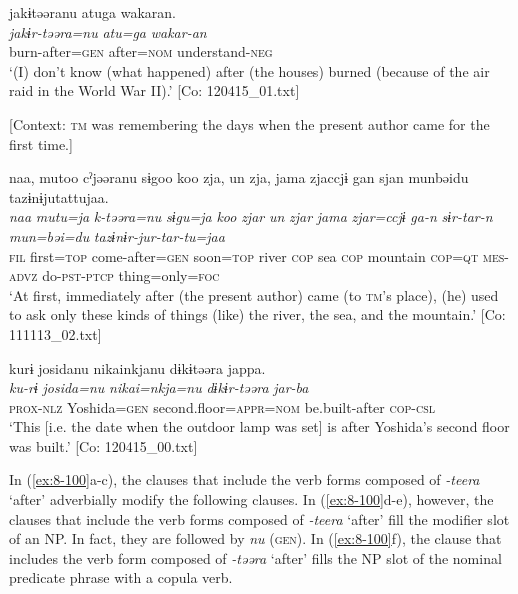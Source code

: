 \ex
{\TM}
\glll  jakɨtəəranu  atuga  wakaran.\\
\textit{jakɨr-təəra=nu}  \textit{atu=ga}  \textit{wakar-an}\\
burn-after=\textsc{gen}  after=\textsc{nom}  understand-\textsc{neg}\\
\glt ‘(I) don’t know (what happened) after (the houses) burned (because of the air raid in the World War II).’ [Co: 120415\_01.txt]

\ex {}[Context: \textsc{tm} was remembering the days when the present author came for the first time.]

{\TM}
\glll  naa,  mutoo  cˀjəəranu  sɨgoo  koo  zja,  un  zja,      jama  zjaccjɨ  gan  sjan  munbəidu    tazɨnɨjutattujaa.\\
\textit{naa}  \textit{mutu=ja}  \textit{k-təəra=nu}  \textit{sɨgu=ja}  \textit{koo}  \textit{zjar}  \textit{un}  \textit{zjar}  \textit{jama}  \textit{zjar=ccjɨ}  \textit{ga-n}  \textit{sɨr-tar-n}  \textit{mun=bəi=du}  \textit{tazɨnɨr-jur-tar-tu=jaa}\\
\textsc{fil}  first=\textsc{top}  come-after=\textsc{gen}  soon=\textsc{top}  river  \textsc{cop}  sea  \textsc{cop}  mountain  \textsc{cop}=\textsc{qt}  \textsc{mes}-\textsc{advz}  do-\textsc{pst}-\textsc{ptcp}  thing=only=\textsc{foc}   \\
\glt ‘At first, immediately after (the present author) came (to \textsc{tm}’s place), (he) used to ask only these kinds of things (like) the river, the sea, and the mountain.’ [Co: 111113\_02.txt]

\ex
{\TM}
\glll  kurɨ  josidanu  {\textbar}nikai{\textbar}nkjanu  dɨkɨtəəra      jappa.\\
\textit{ku-rɨ}  \textit{josida=nu}  \textit{nikai=nkja=nu}  \textit{dɨkɨr-təəra}      \textit{jar-ba}\\
\textsc{prox}-\textsc{nlz}  Yoshida=\textsc{gen}  second.floor=\textsc{appr}=\textsc{nom}  be.built-after   \textsc{cop}-\textsc{csl}\\
\glt ‘This [i.e. the date when the outdoor lamp was set] is after Yoshida’s second floor was built.’ [Co: 120415\_00.txt]
\z
\z

In (\ref{ex:8-100}a-c), the clauses that include the verb forms composed of \textit{-teera} ‘after’ adverbially modify the following clauses. In (\ref{ex:8-100}d-e), however, the clauses that include the verb forms composed of \textit{-teera} ‘after’ fill the modifier slot of an NP. In fact, they are followed by \textit{nu} (\textsc{gen}). In (\ref{ex:8-100}f), the clause that includes the verb form composed of \textit{-təəra} ‘after’ fills the NP slot of the nominal predicate phrase with a copula verb.

